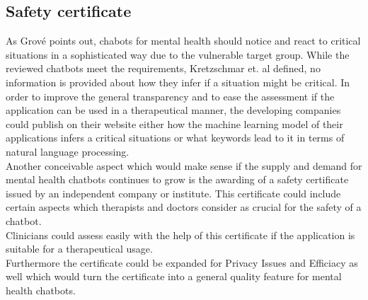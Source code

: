 \documentclass[sigconf, nonacm]{acmart}
\begin{document}
\subsection{Safety certificate}
As Grové \cite{Grove2021} points out, chabots for mental health should notice and react to critical situations in a sophisticated way due to the vulnerable target group. While the reviewed chatbots meet the requirements, Kretzschmar et. al \cite{Kretzschmar2019} defined,
no information is provided about how they infer if a situation might be critical. In order to improve the general transparency and to ease the assessment if the application can be used in a therapeutical manner, the developing companies could publish on their website either how the machine learning model of their applications infers 
a critical situations or what keywords lead to it in terms of natural language processing.\\
Another conceivable aspect which would make sense if the supply and demand for mental health chatbots continues to grow is the awarding of a safety certificate issued by an independent company or institute. This certificate could include certain aspects which therapists and doctors consider as crucial for the safety of a chatbot.\\ 
Clinicians could assess easily with the help of this certificate if the application is suitable for a therapeutical usage.\\
Furthermore the certificate could be expanded for Privacy Issues and Efficiacy as well which would turn the certificate into a general quality feature for mental health chatbots.
\end{document}
